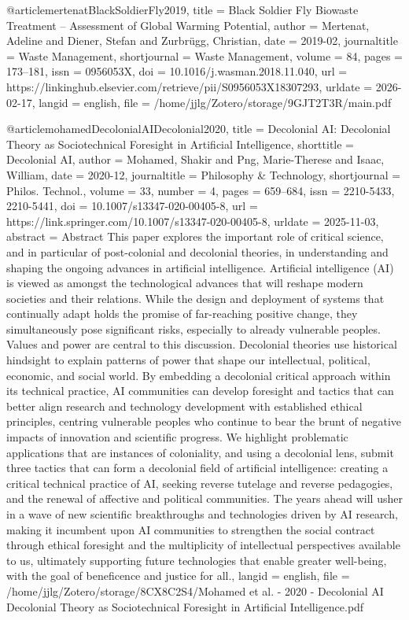 {{{{@article{mertenatBlackSoldierFly2019,
  title = {Black {{Soldier Fly}} Biowaste Treatment – {{Assessment}} of Global Warming Potential},
  author = {Mertenat, Adeline and Diener, Stefan and Zurbrügg, Christian},
  date = {2019-02},
  journaltitle = {Waste Management},
  shortjournal = {Waste Management},
  volume = {84},
  pages = {173--181},
  issn = {0956053X},
  doi = {10.1016/j.wasman.2018.11.040},
  url = {https://linkinghub.elsevier.com/retrieve/pii/S0956053X18307293},
  urldate = {2026-02-17},
  langid = {english},
  file = {/home/jjlg/Zotero/storage/9GJT2T3R/main.pdf}
}

@article{mohamedDecolonialAIDecolonial2020,
  title = {Decolonial {{AI}}: {{Decolonial Theory}} as {{Sociotechnical Foresight}} in {{Artificial Intelligence}}},
  shorttitle = {Decolonial {{AI}}},
  author = {Mohamed, Shakir and Png, Marie-Therese and Isaac, William},
  date = {2020-12},
  journaltitle = {Philosophy \& Technology},
  shortjournal = {Philos. Technol.},
  volume = {33},
  number = {4},
  pages = {659--684},
  issn = {2210-5433, 2210-5441},
  doi = {10.1007/s13347-020-00405-8},
  url = {https://link.springer.com/10.1007/s13347-020-00405-8},
  urldate = {2025-11-03},
  abstract = {Abstract             This paper explores the important role of critical science, and in particular of post-colonial and decolonial theories, in understanding and shaping the ongoing advances in artificial intelligence. Artificial intelligence (AI) is viewed as amongst the technological advances that will reshape modern societies and their relations. While the design and deployment of systems that continually adapt holds the promise of far-reaching positive change, they simultaneously pose significant risks, especially to already vulnerable peoples. Values and power are central to this discussion. Decolonial theories use historical hindsight to explain patterns of power that shape our intellectual, political, economic, and social world. By embedding a decolonial critical approach within its technical practice, AI communities can develop foresight and tactics that can better align research and technology development with established ethical principles, centring vulnerable peoples who continue to bear the brunt of negative impacts of innovation and scientific progress. We highlight problematic applications that are instances of coloniality, and using a decolonial lens, submit three tactics that can form a decolonial field of artificial intelligence: creating a critical technical practice of AI, seeking reverse tutelage and reverse pedagogies, and the renewal of affective and political communities. The years ahead will usher in a wave of new scientific breakthroughs and technologies driven by AI research, making it incumbent upon AI communities to strengthen the social contract through ethical foresight and the multiplicity of intellectual perspectives available to us, ultimately supporting future technologies that enable greater well-being, with the goal of beneficence and justice for all.},
  langid = {english},
  file = {/home/jjlg/Zotero/storage/8CX8C2S4/Mohamed et al. - 2020 - Decolonial AI Decolonial Theory as Sociotechnical Foresight in Artificial Intelligence.pdf}
}

}}}}
